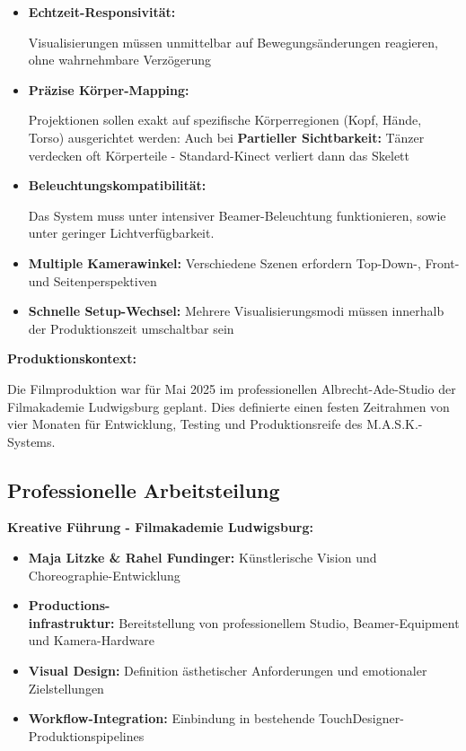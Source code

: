 \begin{itemize}
    \item \textbf{Echtzeit-Responsivität:} \raggedright Visualisierungen müssen unmittelbar auf Bewegungsänderungen reagieren, ohne wahrnehmbare Verzögerung
    \item \textbf{Präzise Körper-Mapping:} \raggedright Projektionen sollen exakt auf spezifische Körperregionen (Kopf, Hände, Torso) ausgerichtet werden: Auch bei \textbf{Partieller Sichtbarkeit:} Tänzer verdecken oft Körperteile - Standard-Kinect verliert dann das Skelett
    \item \textbf{Beleuchtungskompatibilität:} \raggedright Das System muss unter intensiver Beamer-Beleuchtung funktionieren, sowie unter geringer Lichtverfügbarkeit.
    \item \textbf{Multiple Kamerawinkel:} Verschiedene Szenen erfordern Top-Down-, Front- und Seitenperspektiven
    \item \textbf{Schnelle Setup-Wechsel:} Mehrere Visualisierungsmodi müssen innerhalb der Produktionszeit umschaltbar sein
\end{itemize}

\textbf{Produktionskontext:}

\raggedright Die Filmproduktion war für Mai 2025 im professionellen Albrecht-Ade-Studio der Filmakademie Ludwigsburg geplant. Dies definierte einen festen Zeitrahmen von vier Monaten für Entwicklung, Testing und Produktionsreife des M.A.S.K.-Systems.

\newpage

\subsection{Professionelle Arbeitsteilung}

\textbf{Kreative Führung - Filmakademie Ludwigsburg:}
\begin{itemize}
    \item \textbf{Maja Litzke \& Rahel Fundinger:} Künstlerische Vision und Choreographie-Entwicklung
    \item \textbf{Productions-\\infrastruktur:} Bereitstellung von professionellem Studio, Beamer-Equipment und Kamera-Hardware
    \item \textbf{Visual Design:} Definition ästhetischer Anforderungen und emotionaler Zielstellungen
    \item \textbf{Workflow-Integration:} Einbindung in bestehende TouchDesigner-Produktionspipelines
\end{itemize}


